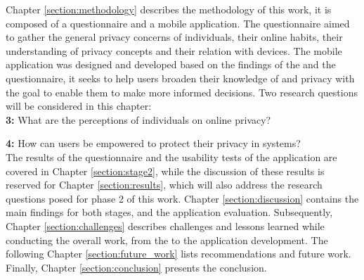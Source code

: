 Chapter \ref{section:methodology} describes the methodology of this work, it is composed of a
questionnaire and a mobile application. The questionnaire aimed to gather
the general privacy concerns of individuals, their online habits, their
understanding of privacy concepts and their relation with \hyperlink{\acronym}{\acronym} devices.
The mobile application was designed and developed based on the findings
of the \hyperlink{\acronym}{\acronym} and the questionnaire, it seeks to help users broaden their
knowledge of \hyperlink{\acronym}{\acronym} and privacy with the goal to enable them to make more
informed decisions. Two research questions will be considered in this
chapter:\\


\textbf{\hyperlink{\acronym}{\acronym}3:} What are the perceptions of individuals on online privacy?

\textbf{\hyperlink{\acronym}{\acronym}4:} How can users be empowered to protect their privacy in \hyperlink{\acronym}{\acronym} systems?\\

The results of the questionnaire and the usability tests of the application are
covered in Chapter \ref{section:stage2}, while the discussion of these results is reserved for
Chapter \ref{section:results}, which will also address the research questions posed for phase 2 of
this work. Chapter \ref{section:discussion} contains the main findings for both stages, \hyperlink{\acronym}{\acronym} and the
application evaluation. Subsequently, Chapter \ref{section:challenges} describes challenges and lessons
learned while conducting the overall work, from the \hyperlink{\acronym}{\acronym} to the application
development. The following Chapter \ref{section:future_work} lists recommendations and future work.
Finally, Chapter \ref{section:conclusion} presents the conclusion.
